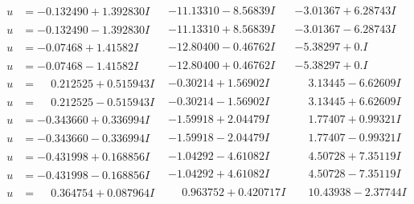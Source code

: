 \documentclass[1p]{elsarticle_modified}
\theoremstyle{definition}
\begin{document}
$$\begin{array}{c|c|c}
\begin{aligned}
u &= -0.132490 + 1.392830 I\end{aligned}
 & -11.13310 - 8.56839 I & -3.01367 + 6.28743 I \\ \hline\begin{aligned}
u &= -0.132490 - 1.392830 I\end{aligned}
 & -11.13310 + 8.56839 I & -3.01367 - 6.28743 I \\ \hline\begin{aligned}
u &= -0.07468 + 1.41582 I\end{aligned}
 & -12.80400 - 0.46762 I & -5.38297 + 0. I\phantom{ +0.000000I} \\ \hline\begin{aligned}
u &= -0.07468 - 1.41582 I\end{aligned}
 & -12.80400 + 0.46762 I & -5.38297 + 0. I\phantom{ +0.000000I} \\ \hline\begin{aligned}
u &= \phantom{-}0.212525 + 0.515943 I\end{aligned}
 & -0.30214 + 1.56902 I & \phantom{-}3.13445 - 6.62609 I \\ \hline\begin{aligned}
u &= \phantom{-}0.212525 - 0.515943 I\end{aligned}
 & -0.30214 - 1.56902 I & \phantom{-}3.13445 + 6.62609 I \\ \hline\begin{aligned}
u &= -0.343660 + 0.336994 I\end{aligned}
 & -1.59918 + 2.04479 I & \phantom{-}1.77407 + 0.99321 I \\ \hline\begin{aligned}
u &= -0.343660 - 0.336994 I\end{aligned}
 & -1.59918 - 2.04479 I & \phantom{-}1.77407 - 0.99321 I \\ \hline\begin{aligned}
u &= -0.431998 + 0.168856 I\end{aligned}
 & -1.04292 - 4.61082 I & \phantom{-}4.50728 + 7.35119 I \\ \hline\begin{aligned}
u &= -0.431998 - 0.168856 I\end{aligned}
 & -1.04292 + 4.61082 I & \phantom{-}4.50728 - 7.35119 I \\ \hline\begin{aligned}
u &= \phantom{-}0.364754 + 0.087964 I\end{aligned}
 & \phantom{-}0.963752 + 0.420717 I & \phantom{-}10.43938 - 2.37744 I \\ \hline\begin{aligned}

\end{aligned}
\end{array}$$
\end{document}
